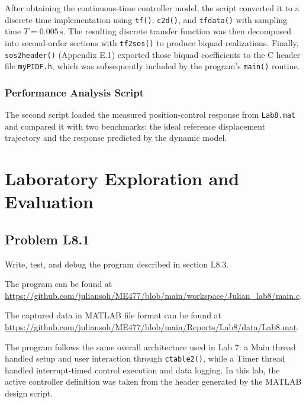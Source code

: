 \documentclass[10pt,twocolumn]{article}
\begin{document}
After obtaining the continuous-time controller model, the script converted it to a discrete-time implementation using \texttt{tf()}, \texttt{c2d()}, and \texttt{tfdata()} with sampling time $T = 0.005\,\text{s}$. The resulting discrete transfer function was then decomposed into second-order sections with \texttt{tf2sos()} to produce biquad realizations. Finally, \texttt{sos2header()} (Appendix E.1) exported those biquad coefficients to the C header file \texttt{myPIDF.h}, which was subsequently included by the program's \texttt{main()} routine.

\subsubsection{Performance Analysis Script}
The second script loaded the measured position-control response from \texttt{Lab8.mat} and compared it with two benchmarks: the ideal reference displacement trajectory and the response predicted by the dynamic model.

\section{Laboratory Exploration and Evaluation}

\subsection{Problem L8.1}
Write, test, and debug the program described in section L8.3.

\vspace{\baselineskip}

The program can be found at \url{https://github.com/juliansoh/ME477/blob/main/workspace/Julian_lab8/main.c}.

The captured data in MATLAB file format can be found at \url{https://github.com/juliansoh/ME477/blob/main/Reports/Lab8/data/Lab8.mat}.

The program follows the same overall architecture used in Lab 7: a Main thread handled setup and user interaction through \texttt{ctable2()}, while a Timer thread handled interrupt-timed control execution and data logging. In this lab, the active controller definition was taken from the header generated by the MATLAB design script.
\end{document}
